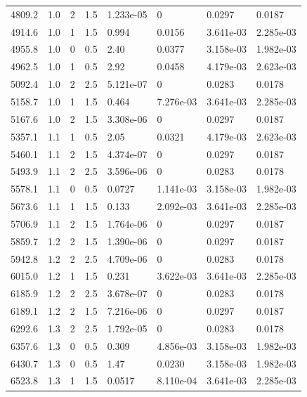 \documentclass[preview]{standalone}
\begin{document}
{{{\begin{tabular}{L{1.2cm}C{1.2cm} C{0.3cm}C{0.5cm} C{1.4cm}C{1.4cm} C{1.4cm}C{1.4cm}}
  4809.2  &   1.0  & 2     & 1.5 &  1.233e-05  & 0  & 0.0297 &  0.0187   \\ 
  4914.6  &   1.0  & 1     & 1.5 &  0.994  & 0.0156  & 3.641e-03 &  2.285e-03   \\ 
  4955.8  &   1.0  & 0     & 0.5 &  2.40  & 0.0377  & 3.158e-03 &  1.982e-03   \\ 
  4962.5  &   1.0  & 1     & 0.5 &  2.92  & 0.0458  & 4.179e-03 &  2.623e-03   \\ 
  5092.4  &   1.0  & 2     & 2.5 &  5.121e-07  & 0  & 0.0283 &  0.0178   \\ 
  5158.7  &   1.0  & 1     & 1.5 &  0.464  & 7.276e-03  & 3.641e-03 &  2.285e-03   \\ 
  5167.6  &   1.0  & 2     & 1.5 &  3.308e-06  & 0  & 0.0297 &  0.0187   \\ 
  5357.1  &   1.1  & 1     & 0.5 &  2.05  & 0.0321  & 4.179e-03 &  2.623e-03   \\ 
  5460.1  &   1.1  & 2     & 1.5 &  4.374e-07  & 0  & 0.0297 &  0.0187   \\ 
  5493.9  &   1.1  & 2     & 2.5 &  3.596e-06  & 0  & 0.0283 &  0.0178   \\ 
  5578.1  &   1.1  & 0     & 0.5 &  0.0727  & 1.141e-03  & 3.158e-03 &  1.982e-03   \\ 
  5673.6  &   1.1  & 1     & 1.5 &  0.133  & 2.092e-03  & 3.641e-03 &  2.285e-03   \\ 
  5706.9  &   1.1  & 2     & 1.5 &  1.764e-06  & 0  & 0.0297 &  0.0187   \\ 
  5859.7  &   1.2  & 2     & 1.5 &  1.390e-06  & 0  & 0.0297 &  0.0187   \\ 
  5942.8  &   1.2  & 2     & 2.5 &  4.709e-06  & 0  & 0.0283 &  0.0178   \\ 
  6015.0  &   1.2  & 1     & 1.5 &  0.231  & 3.622e-03  & 3.641e-03 &  2.285e-03   \\ 
  6185.9  &   1.2  & 2     & 2.5 &  3.678e-07  & 0  & 0.0283 &  0.0178   \\ 
  6189.1  &   1.2  & 2     & 1.5 &  7.216e-06  & 0  & 0.0297 &  0.0187   \\ 
  6292.6  &   1.3  & 2     & 2.5 &  1.792e-05  & 0  & 0.0283 &  0.0178   \\ 
  6357.6  &   1.3  & 0     & 0.5 &  0.309  & 4.856e-03  & 3.158e-03 &  1.982e-03   \\ 
  6430.7  &   1.3  & 0     & 0.5 &  1.47  & 0.0230  & 3.158e-03 &  1.982e-03   \\ 
  6523.8  &   1.3  & 1     & 1.5 &  0.0517  & 8.110e-04  & 3.641e-03 &  2.285e-03   \\ 

\end{tabular}}}}
\end{document}
